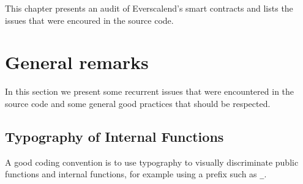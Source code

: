 


\noindent This chapter presents an audit of Everscalend's smart contracts and lists the issues that were encoured in the source code.



\listoffigures





\section{General remarks}

In this section we present some recurrent issues that were encountered in the source code and some general good practices that should be respected. 





\subsection{Typography of Internal Functions}
\label{readability:internal}

A good coding convention is to use typography to visually discriminate public functions and internal functions, for example using a prefix such as {\tt \_}.



